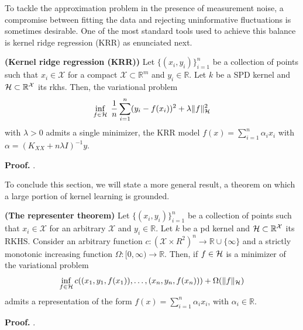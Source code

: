 To tackle the approximation problem in the presence of measurement noise, a compromise between fitting the data and rejecting uninformative fluctuations is sometimes desirable. One of the most standard tools used to achieve this balance is kernel ridge regression (KRR) as enunciated next.

\begin{proposition}
	\textbf{(Kernel ridge regression (KRR))}
	Let $\{(x_i,y_i)\}_{i=1}^n$ be a collection of points such that $x_i \in \mathcal{X}$ for a compact $\mathcal{X} \subset \mathbb{R}^m$ and $y_i \in \mathbb{R}$. Let $k$ be a SPD kernel and $\mathcal{H} \subset \mathbb{R}^\mathcal{X}$ its \ac{rkhs}. Then, the variational problem
	\begin{equation}
		\inf_{f\in \mathcal{H}} \; \frac{1}{n} \sum_{i=1}^n (y_i - f(x_i))^2 + \lambda \Vert f \Vert_{\mathcal{H}}^2
		\label{eq.krr_model}
	\end{equation}
	with $\lambda > 0$ admits a single minimizer, the KRR model $f(x) = \sum_{i=1}^n \alpha_i x_i$ with $\alpha = (K_{XX} + n \lambda I)^{-1} y$. 
\end{proposition}
\begin{my_proof}
	\textbf{Proof.}
	\cite{kimeldorf1971some}.
\end{my_proof}

To conclude this section, we will state a more general result, a theorem on which a large portion of kernel learning is grounded.

\begin{theorem}
	\textbf{(The representer theorem)}
	Let $\{(x_i,y_i)\}_{i=1}^n$ be a collection of points such that $x_i \in \mathcal{X}$ for an arbitrary $\mathcal{X}$ and $y_i \in \mathbb{R}$. Let $k$ be a \ac{pd} kernel and $\mathcal{H} \subset \mathbb{R}^\mathcal{X}$ its RKHS. Consider an arbitrary function $c : (\mathcal{X} \times R^2)^n \rightarrow \mathbb{R} \cup \{\infty\}$ and a strictly monotonic increasing function $\Omega: [0,\infty) \rightarrow \mathbb{R}$. Then, if $f \in \mathcal{H}$ is a minimizer of the variational problem
	\begin{equation}
		\label{eq.representer_theorem_general_loss}
		\inf_{f\in \mathcal{H}} c((x_1,y_1,f(x_1)),\dots,(x_n,y_n,f(x_n))) + \Omega(\Vert f \Vert_{\mathcal{H}})
	\end{equation}
	admits a representation of the form $f(x) = \sum_{i=1}^n \alpha_i x_i$, with $\alpha_i \in \mathbb{R}$. 
\end{theorem}

\begin{my_proof}
	\textbf{Proof.}
	\cite{scholkopf2001generalized}.
\end{my_proof}

